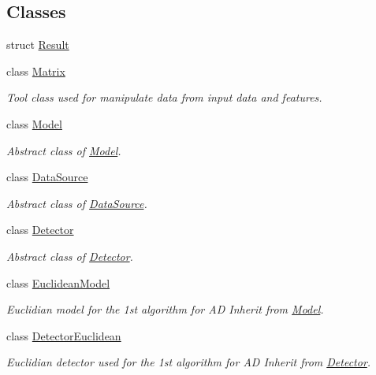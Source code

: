 \subsection*{Classes}
\begin{DoxyCompactItemize}
\item 
struct \hyperlink{structResult}{Result}
\item 
class \hyperlink{classMatrix}{Matrix}
\begin{DoxyCompactList}\small\item\em Tool class used for manipulate data from input data and features. \end{DoxyCompactList}\item 
class \hyperlink{classModel}{Model}
\begin{DoxyCompactList}\small\item\em Abstract class of \hyperlink{classModel}{Model}. \end{DoxyCompactList}\item 
class \hyperlink{classDataSource}{Data\+Source}
\begin{DoxyCompactList}\small\item\em Abstract class of \hyperlink{classDataSource}{Data\+Source}. \end{DoxyCompactList}\item 
class \hyperlink{classDetector}{Detector}
\begin{DoxyCompactList}\small\item\em Abstract class of \hyperlink{classDetector}{Detector}. \end{DoxyCompactList}\item 
class \hyperlink{classEuclideanModel}{Euclidean\+Model}
\begin{DoxyCompactList}\small\item\em Euclidian model for the 1st algorithm for A\+D Inherit from \hyperlink{classModel}{Model}. \end{DoxyCompactList}\item 
class \hyperlink{classDetectorEuclidean}{Detector\+Euclidean}
\begin{DoxyCompactList}\small\item\em Euclidian detector used for the 1st algorithm for A\+D Inherit from \hyperlink{classDetector}{Detector}. \end{DoxyCompactList}\end{DoxyCompactItemize}
